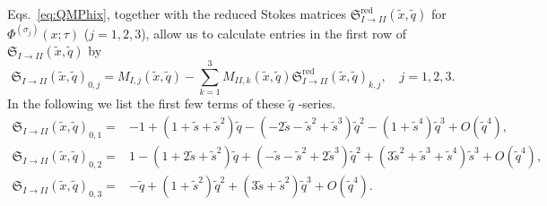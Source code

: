 \documentclass[12pt,reqno]{amsart}
\theoremstyle{definition}
\def\s{\sigma}
\def\tq{\tilde{q}}
\def\tx{\tilde{x}}
\def\tx{\tilde{x}}
\def\ts{\tilde{s}}
\def\mf{\mathfrak}
\def\cO{O}
\begin{document}
Eqs.~\eqref{eq:QMPhix}, together with the reduced Stokes matrices
$\mf{S}^{\text{red}}_{I\rightarrow II}(\tx,\tq)$ for
$\Phi^{(\s_j)}(x;\tau)$ ($j=1,2,3$), allow us to calculate entries in
the first row of $\mf{S}_{I\rightarrow
  II}(\tx,\tq)$ %
by
\begin{equation}
  \mf{S}_{I\rightarrow II}(\tx,\tq)_{0,j} =
  M_{I,j}(\tx,\tq) - \sum_{k=1}^3M_{II,k}(\tx,\tq)
  \mf{S}^{\text{red}}_{I\rightarrow II}(\tx,\tq)_{k,j},\quad j=1,2,3.
\end{equation}
In the following we list the first few terms of these
$\tq$%
-series.  %
\begin{equation}
  \begin{aligned}
    \mf{S}_{I\rightarrow II}(\tx,\tq)_{0,1}=
    &-1+(1+\ts+\ts^2)\tq -(-2\ts-\ts^2+\ts^3)\tq^2-(1+\ts^4)\tq^3
      +\cO(\tq^4) ,\\
    \mf{S}_{I\rightarrow II}(\tx,\tq)_{0,2}=
    &1-(1+2\ts+\ts^2)\tq+(-\ts-\ts^2+2\ts^3)\tq^2+(3\ts^2+\ts^3+\ts^4)\ts^3
      +\cO(\tq^4) ,\\
    \mf{S}_{I\rightarrow II}(\tx,\tq)_{0,3}=
    &-\tq+(1+\ts^2)\tq^2+(3\ts+\ts^2)\tq^3+\cO(\tq^4).
  \end{aligned}
\end{equation}
\end{document}
